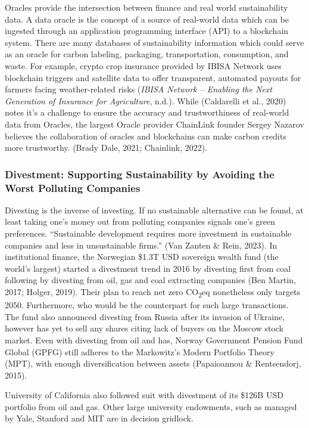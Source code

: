 \documentclass[
  12pt,
  letterpaper,
  DIV=11,
  numbers=noendperiod]{scrartcl}
\begin{document}
Oracles provide the intersection between finance and real world
sustainability data. A data oracle is the concept of a source of
real-world data which can be ingested through an application programming
interface (API) to a blockchain system. There are many databases of
sustainability information which could serve as an oracle for carbon
labeling, packaging, transportation, consumption, and waste. For
example, crypto crop insurance provided by IBISA Network uses blockchain
triggers and satellite data to offer transparent, automated payouts for
farmers facing weather-related risks (\emph{{IBISA Network} --
{Enabling} the {Next Generation} of {Insurance} for {Agriculture}},
n.d.). While (Caldarelli et al., 2020) notes it's a challenge to ensure
the accuracy and trustworthiness of real-world data from Oracles, the
largest Oracle provider ChainLink founder Sergey Nazarov believes the
collaboration of oracles and blockchains can make carbon credits more
trustworthy. (Brady Dale, 2021; Chainlink, 2022).

\subsubsection{Divestment: Supporting Sustainability by Avoiding the
Worst Polluting
Companies}\label{divestment-supporting-sustainability-by-avoiding-the-worst-polluting-companies}

Divesting is the inverse of investing. If no sustainable alternative can
be found, at least taking one's money out from polluting companies
signals one's green preferences. ``Sustainable development requires more
investment in sustainable companies and less in unsustainable firms.''
(Van Zanten \& Rein, 2023). In institutional finance, the Norwegian
\$1.3T USD sovereign wealth fund (the world's largest) started a
divestment trend in 2016 by divesting first from coal following by
divesting from oil, gas and coal extracting companies (Ben Martin, 2017;
Holger, 2019). Their plan to reach net zero CO\textsubscript{2}eq
nonetheless only targets 2050. Furthermore, who would be the counterpart
for such large transactions. The fund also announced divesting from
Russia after its invasion of Ukraine, however has yet to sell any shares
citing lack of buyers on the Moscow stock market. Even with divesting
from oil and has, Norway Government Pension Fund Global (GPFG) still
adheres to the Markowitz's Modern Portfolio Theory (MPT), with enough
diversification between assets (Papaioannou \& Rentsendorj, 2015).

University of California also followed suit with divestment of its
\$126B USD portfolio from oil and gas. Other large university
endowments, such as managed by Yale, Stanford and MIT are in decision
gridlock.
\end{document}
